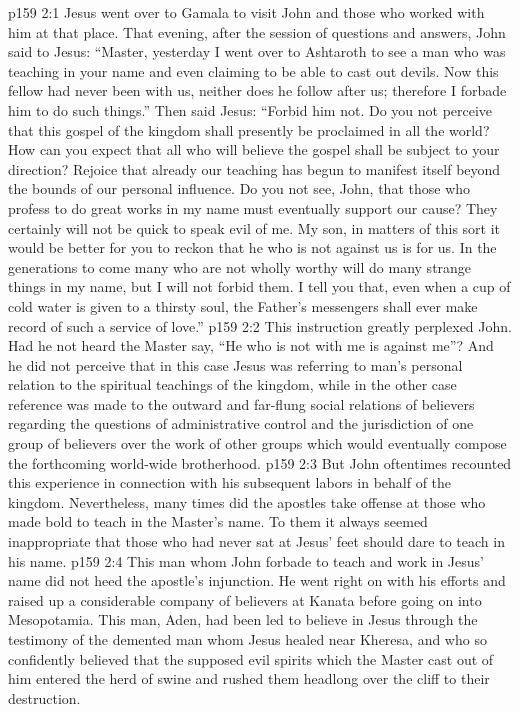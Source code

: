 \vs p159 2:1 Jesus went over to Gamala to visit John and those who worked with him at that place. That evening, after the session of questions and answers, John said to Jesus: “Master, yesterday I went over to Ashtaroth to see a man who was teaching in your name and even claiming to be able to cast out devils. Now this fellow had never been with us, neither does he follow after us; therefore I forbade him to do such things.” Then said Jesus: \textcolor{ubdarkred}{“Forbid him not. Do you not perceive that this gospel of the kingdom shall presently be proclaimed in all the world? How can you expect that all who will believe the gospel shall be subject to your direction? Rejoice that already our teaching has begun to manifest itself beyond the bounds of our personal influence. Do you not see, John, that those who profess to do great works in my name must eventually support our cause? They certainly will not be quick to speak evil of me. My son, in matters of this sort it would be better for you to reckon that he who is not against us is for us. In the generations to come many who are not wholly worthy will do many strange things in my name, but I will not forbid them. I tell you that, even when a cup of cold water is given to a thirsty soul, the Father’s messengers shall ever make record of such a service of love.”}\plusone
\vs p159 2:2 This instruction greatly perplexed John. Had he not heard the Master say, \textcolor{ubdarkred}{“He who is not with me is against me”?} And he did not perceive that in this case Jesus was referring to man’s personal relation to the spiritual teachings of the kingdom, while in the other case reference was made to the outward and far\hyp{}flung social relations of believers regarding the questions of administrative control and the jurisdiction of one group of believers over the work of other groups which would eventually compose the forthcoming world\hyp{}wide brotherhood.
\vs p159 2:3 But John oftentimes recounted this experience in connection with his subsequent labors in behalf of the kingdom. Nevertheless, many times did the apostles take offense at those who made bold to teach in the Master’s name. To them it always seemed inappropriate that those who had never sat at Jesus’ feet should dare to teach in his name.
\vs p159 2:4 This man whom John forbade to teach and work in Jesus’ name did not heed the apostle’s injunction. He went right on with his efforts and raised up a considerable company of believers at Kanata before going on into Mesopotamia. This man, Aden, had been led to believe in Jesus through the testimony of the demented man whom Jesus healed near Kheresa, and who so confidently believed that the supposed evil spirits which the Master cast out of him entered the herd of swine and rushed them headlong over the cliff to their destruction.
